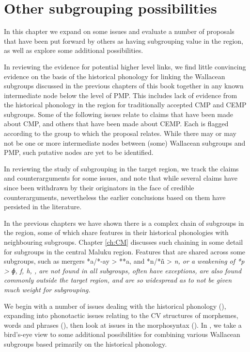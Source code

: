 \chapter{Other subgrouping possibilities}\label{ch:OthSub}
In this chapter we expand on some issues
and evaluate a number of proposals that have been put forward
by others as having subgrouping value in the region,
as well as explore some additional possibilities.

In reviewing the evidence for potential higher level links,
we find little convincing evidence on the basis of the historical
phonology for linking the Wallacean subgroups discussed in the
previous chapters of this book together in any known intermediate
node below the level of PMP.
This includes lack of evidence from the historical phonology
in the region for traditionally accepted CMP and CEMP subgroups.
Some of the following issues relate to claims that have been
made about CMP, and others that have been made about CEMP.
Each is flagged according to the group to which the proposal relates.
While there may or may not be one or more intermediate nodes
between (some) Wallacean subgroups
and PMP, such putative nodes are yet to be identified.

In reviewing the study of subgrouping in the target region,
we track the claims
and counterarguments for some issues,
and note that while several claims have since been withdrawn
by their originators in the face of credible counterarguments,
nevertheless the earlier conclusions based on them have persisted in the literature.

In the previous chapters we have shown there is a complex chain
of subgroups in the region,
some of which share features in their historical phonologies with neighbouring subgroups.
Chapter \ref{ch:CM} discusses such chaining in some detail for subgroups
in the central Maluku region.
Features that are shared across some subgroups,
such as mergers *a/*-ay > **a,
and *n/*ñ > \it{n},
or a weakening of *p > \it{ɸ,
f, h}, {\0}, are not found in all subgroups,
often have exceptions, are also found commonly outside the target
region, and are so widespread as to not be given much weight for subgrouping.

We begin with a number of issues dealing with the historical
phonology (), expanding into phonotactic issues relating to the CV structures
of morphemes, words and phrases (), then look at issues in the morphosyntax ().
In , we take a bird’s-eye view to some additional
possibilities for combining various Wallacean subgroups based
primarily on the historical phonology.

